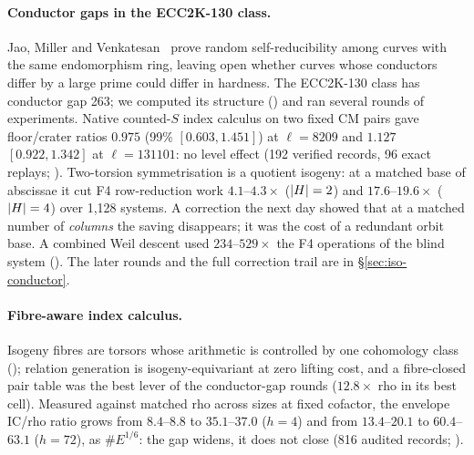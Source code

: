 \paragraph{Conductor gaps in the ECC2K-130 class.} Jao, Miller and
Venkatesan~\cite{jmv2005} prove random self-reducibility among curves with
the same endomorphism ring, leaving open whether curves whose conductors
differ by a large prime could differ in hardness. The ECC2K-130 class has
conductor gap 263; we computed its structure
() and ran
several rounds of experiments. Native counted-$S$ index calculus on two fixed CM
pairs gave floor/crater ratios $0.975$ (99\% $[0.603,1.451]$) at
$\ell=8209$ and $1.127$ $[0.922,1.342]$ at $\ell=131101$: no level effect
(192 verified records, 96 exact replays;
). Two-torsion
symmetrisation is a quotient isogeny: at a matched base of abscissae it
cut F4 row-reduction work $4.1$--$4.3\times$ ($\lvert H \rvert=2$) and
$17.6$--$19.6\times$ ($\lvert H \rvert=4$) over 1{,}128 systems. A correction
the next day showed that at a matched number of \emph{columns} the saving
disappears; it was the cost of a redundant orbit base. A combined Weil
descent used $234$--$529\times$ the F4 operations of the blind system
(). The later rounds and
the full correction trail are in \S\ref{sec:iso-conductor}.

\paragraph{Fibre-aware index calculus.} Isogeny fibres are torsors whose
arithmetic is controlled by one cohomology class
(); relation generation is
isogeny-equivariant at zero lifting cost, and a fibre-closed pair table was
the best lever of the conductor-gap rounds ($12.8\times$ rho in its best
cell). Measured against matched rho across sizes at fixed cofactor, the
envelope IC/rho ratio grows from $8.4$--$8.8$ to $35.1$--$37.0$ ($h=4$) and
from $13.4$--$20.1$ to $60.4$--$63.1$ ($h=72$), as $\#E^{1/6}$: the gap
widens, it does not close (816 audited records;
).

